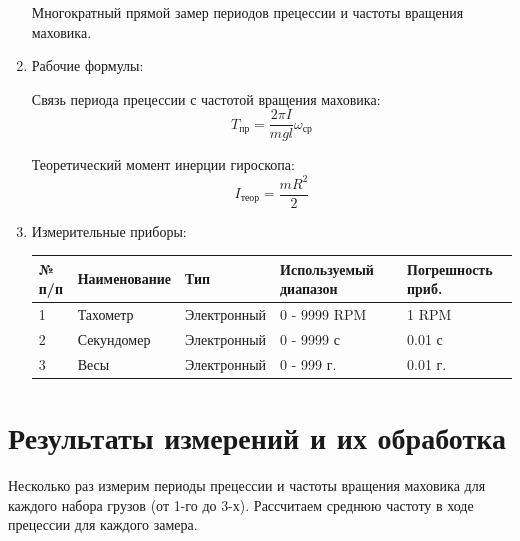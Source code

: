 \documentclass[12pt, a4paper]{article}
\begin{document}
\begin{enumerate}
Многократный прямой замер периодов прецессии и частоты вращения маховика.

\item Рабочие формулы:

Связь периода прецессии с частотой вращения маховика:
\begin{equation}
T_{\text{пр}} = \frac{2\pi I}{mgl}\omega_{\text{ср}}
\end{equation}

Теоретический момент инерции гироскопа:
\begin{equation}
I_{\text{теор}} = \frac{mR^2}{2}
\end{equation}

\item Измерительные приборы:

\begin{table}[H]
\centering
\begin{tabular}{|l|l|l|l|l|}
\hline
№ п/п & Наименование & Тип & Используемый диапазон & Погрешность приб.\\
\hline
1 & Тахометр & Электронный & 0 - 9999 RPM  & 1 RPM\\
\hline
2 & Секундомер & Электронный & 0 - 9999 с & 0.01 с\\
\hline
3 & Весы & Электронный & 0 - 999 г. & 0.01 г.\\
\hline
\end{tabular}
\end{table}

\end{enumerate}
\section{Результаты измерений и их обработка}

Несколько раз измерим периоды прецессии и частоты вращения маховика для каждого набора грузов (от 1-го до 3-х). Рассчитаем среднюю частоту в ходе прецессии для каждого замера.
\end{document}
